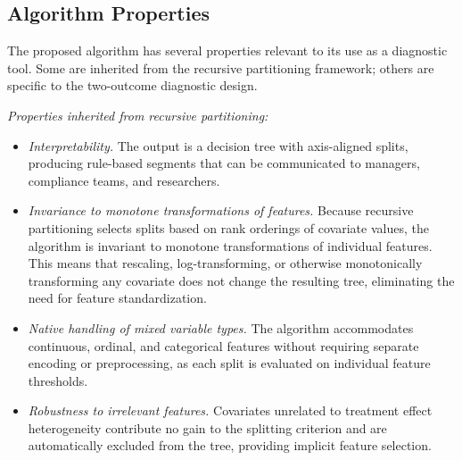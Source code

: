 \documentclass[11pt,letterpaper,english]{article}
\theoremstyle{definition}
\theoremstyle{definition}
\begin{document}
\begin{bibunit}
\subsection{Algorithm Properties}
\label{sec:properties}

The proposed algorithm has several properties relevant to its use as a diagnostic tool. Some are inherited from the recursive partitioning framework; others are specific to the two-outcome diagnostic design.

\vspace{4pt}
\noindent
\emph{Properties inherited from recursive partitioning:}
\begin{itemize}[leftmargin=2em]
    \item \emph{Interpretability.} The output is a decision tree with axis-aligned splits, producing rule-based segments that can be communicated to managers, compliance teams, and researchers.
    \item \emph{Invariance to monotone transformations of features.} Because recursive partitioning selects splits based on rank orderings of covariate values, the algorithm is invariant to monotone transformations of individual features. This means that rescaling, log-transforming, or otherwise monotonically transforming any covariate does not change the resulting tree, eliminating the need for feature standardization.
    \item \emph{Native handling of mixed variable types.} The algorithm accommodates continuous, ordinal, and categorical features without requiring separate encoding or preprocessing, as each split is evaluated on individual feature thresholds.
    \item \emph{Robustness to irrelevant features.} Covariates unrelated to treatment effect heterogeneity contribute no gain to the splitting criterion and are automatically excluded from the tree, providing implicit feature selection.
\end{itemize}


\end{bibunit}
\end{document}
